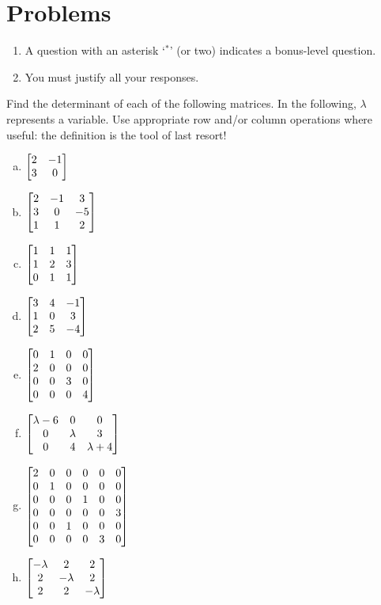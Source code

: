 \section*{Problems}


\begin{enumerate}
\item A question with an asterisk `$ ^\ast$' (or two) indicates a bonus-level question.
 \item You must justify all your responses.
\end{enumerate}
\bigskip


\begin{prob} \label{prob21.1} Find the determinant of each of the following matrices. In the following, $\lambda$ represents a variable.  Use appropriate row and/or column operations where useful: the definition is the tool of last resort!
\medskip
\begin{enumerate}[a)]
\item 
$\bmatrix
2&-1\\3&0 \endbmatrix $
\medskip
%

\item\sov $\bmatrix 
2&-1&3\\3&0&-5\\1&1&2 \endbmatrix $
\medskip
\item 
$\bmatrix
1&1&1\\1&2&3\\0&1&1 \endbmatrix $
\medskip
\item\sov $\bmatrix 3&4&-
1\\1&0&3\\2&5&-4\endbmatrix$\medskip
\item 
$\bmatrix 0&1&0&0\\
2&0&0&0\\
0&0&3&0\\
0&0&0&4\\
\endbmatrix$ 
\medskip
\item\sov $\bmatrix \lambda-6&0&0\\0&\lambda&3\\0&4&\lambda+4\endbmatrix $\medskip
 \item $\bmatrix 2&0&0&0&0&0\cr0&1&0&0&0&0\cr0&0&0&1&0&0\cr
0&0&0&0&0&3\cr0&0&1&0&0&0\cr0&0&0&0&3&0\endbmatrix$
\medskip
%
\item\sov $\bmatrix
-\lambda&2&2\\ 2&-\lambda&2\\ 2&2&-\lambda \endbmatrix$
\medskip 
%


\end{enumerate}
\end{prob}
